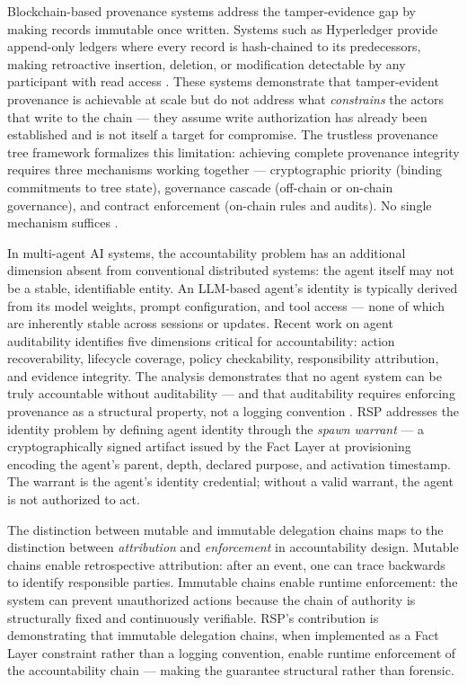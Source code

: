 Blockchain-based provenance systems address the tamper-evidence gap by making records immutable once written. Systems such as Hyperledger provide append-only ledgers where every record is hash-chained to its predecessors, making retroactive insertion, deletion, or modification detectable by any participant with read access \cite{hyperledger2015, nakamoto2008bitcoin}. These systems demonstrate that tamper-evident provenance is achievable at scale but do not address what \emph{constrains} the actors that write to the chain --- they assume write authorization has already been established and is not itself a target for compromise. The trustless provenance tree framework formalizes this limitation: achieving complete provenance integrity requires three mechanisms working together --- cryptographic priority (binding commitments to tree state), governance cascade (off-chain or on-chain governance), and contract enforcement (on-chain rules and audits). No single mechanism suffices \cite{trustless2026}.

In multi-agent AI systems, the accountability problem has an additional dimension absent from conventional distributed systems: the agent itself may not be a stable, identifiable entity. An LLM-based agent's identity is typically derived from its model weights, prompt configuration, and tool access --- none of which are inherently stable across sessions or updates. Recent work on agent auditability identifies five dimensions critical for accountability: action recoverability, lifecycle coverage, policy checkability, responsibility attribution, and evidence integrity. The analysis demonstrates that no agent system can be truly accountable without auditability --- and that auditability requires enforcing provenance as a structural property, not a logging convention \cite{auditability2025}. RSP addresses the identity problem by defining agent identity through the \emph{spawn warrant} --- a cryptographically signed artifact issued by the Fact Layer at provisioning encoding the agent's parent, depth, declared purpose, and activation timestamp. The warrant is the agent's identity credential; without a valid warrant, the agent is not authorized to act.

The distinction between mutable and immutable delegation chains maps to the distinction between \emph{attribution} and \emph{enforcement} in accountability design. Mutable chains enable retrospective attribution: after an event, one can trace backwards to identify responsible parties. Immutable chains enable runtime enforcement: the system can prevent unauthorized actions because the chain of authority is structurally fixed and continuously verifiable. RSP's contribution is demonstrating that immutable delegation chains, when implemented as a Fact Layer constraint rather than a logging convention, enable runtime enforcement of the accountability chain --- making the guarantee structural rather than forensic.

